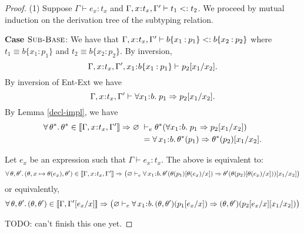 \documentclass[11pt]{article}
\newcommand{\bind}{\hspace{0.05em}{:}\hspace{0.05em}} %
\newcommand{\col}{\mathbin{:}}       %
\newcommand{\lb}{\llbracket}         %
\newcommand{\rb}{\rrbracket}         %
\newcommand{\many}{\hookrightarrow^*}
\newcommand{\true}{\mathtt{true}}
\begin{document}
\begin{proof}
(1) Suppose $\Gamma \vdash e_x:t_x$ and $\Gamma, x\bind t_x ,\Gamma' \vdash t_1 <: t_2$. We proceed by mutual induction on the derivation tree of the subtyping relation.

{\bf Case} $\textsc{Sub-Base}$: We have that 
$\Gamma,x\bind t_x,\Gamma' \vdash b\{x_1\col p_1\} <: b\{x_2\col p_2\}$ where $t_1 \equiv b\{x_1\col p_1\}$ and $t_2 \equiv b\{x_2\col p_2\}$.
By inversion, 
\[\Gamma,x\bind t_x,\Gamma',x_1\bind b\{x_1\col p_1\} \vdash p_2[x_1/x_2].\] 
By inversion of {\sc Ent-Ext} we have 
\begin{equation}\label{311}
\Gamma,x\bind t_x,\Gamma' \vdash \forall x_1\bind b.\; p_1 \Rightarrow p_2[x_1/x_2].\end{equation}
By Lemma \ref{decl-impl}, we have
\begin{align}
\forall\, \theta^*.\, \theta^* \in \lb \Gamma,x\bind t_x,\Gamma'\rb \Rightarrow \varnothing \;&\vdash_e \theta^*(\forall x_1\bind b.\; p_1 \Rightarrow p_2[x_1/x_2]) \\
&= \forall\, x_1\bind b.\, \theta^*(p_1) \Rightarrow \theta^*(p_2)[x_1/x_2].
\end{align}

Let $e_x$ be an expression such that $\Gamma \vdash e_x : t_x$.
The above is equivalent to:
\[
\forall\, \theta, \theta'.\, (\theta, x \mapsto \theta(e_x), \theta') \in \lb\Gamma, x\bind t_x, \Gamma'\rb \Rightarrow \big( \varnothing \vdash_e
\forall\, x_1\bind b.\, \theta'(\theta(p_1)[\theta(e_x)/x]) \Rightarrow \theta'(\theta(p_2)[\theta(e_x)/x]))[x_1/x_2] \big)
\]
or equivalently,
\begin{equation}
\forall\, \theta, \theta'.\, (\theta, \theta') \in \lb\Gamma, \Gamma'[e_x/x]\rb \Rightarrow \big(\varnothing \vdash_e
\forall\, x_1\bind b.\, (\theta, \theta')(p_1[e_x/x]) \Rightarrow (\theta,\theta')(p_2[e_x/x][x_1/x_2])\big)
\end{equation}

TODO: can't finish this one yet.
\begin{comment}
The validity of the implication in (\ref{311}) means that
\begin{equation}\label{312}
\forall\theta^*. \theta^*\in\lb\Gamma,x:t_x,\Gamma',v_1:b\rb \Rightarrow
(\theta^*(p_1)\many\true)\Rightarrow(\theta^*(p_2[v_1/v_2])\many\true)
\end{equation}

Let $(\theta,\theta',v_1\mapsto e_1) \in \lb\Gamma,\Gamma'[e_x/x],v_1:b\rb$ be a closing substitution. Then
\[(\theta,x\mapsto e_x,\theta',v_1\mapsto e_1)
\in \lb \Gamma,x:t_x,\Gamma',v_1:b\rb
\]
because for each $(y:t_y[e_x/x]) \in \Gamma'[e_x/x]$ we have
$\theta'(y) \in\lb\theta'(t_y[e_x/x])\rb$ which implies
$(x\mapsto e_x,\theta')(y) \in \lb(x\mapsto e_x,\theta')(t_y)\rb$.


\end{comment}
\end{proof}
\end{document}
